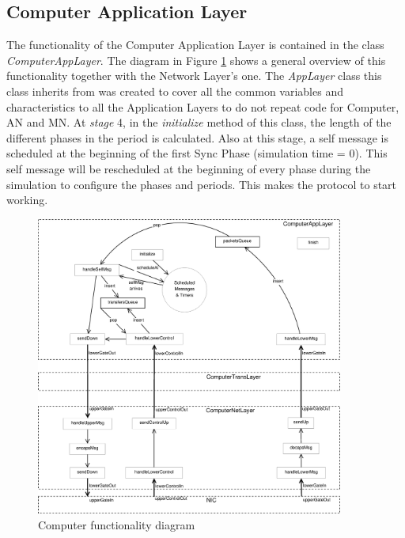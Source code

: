 \subsection{Computer Application Layer}

The functionality of the Computer Application Layer is contained in the class \textit{Computer\-App\-Layer}. The diagram in Figure \ref{fig:Computerschema} 
shows a general overview of this functionality together with the Network Layer's one. The \textit{AppLayer} class this class inherits from
was created to cover all the common variables and characteristics to all the Application Layers to do not repeat code for Computer, \ac{AN}
and \ac{MN}. At \textit{stage} 4, in the \textit{initialize} method of this class, the length of the different phases in the period is calculated. 
Also at this stage, a self message is scheduled at the beginning of the first Sync Phase (simulation time = 0). This self message will be rescheduled 
at the beginning of every phase during the simulation to configure the phases and periods. This makes the protocol to start working.

\begin{figure}[ht]
  \begin{center}
    \includegraphics[width=0.9\textwidth]{Computerschema.eps}
  \end{center}
  \caption{Computer functionality diagram}
  \label{fig:Computerschema}
\end{figure}

